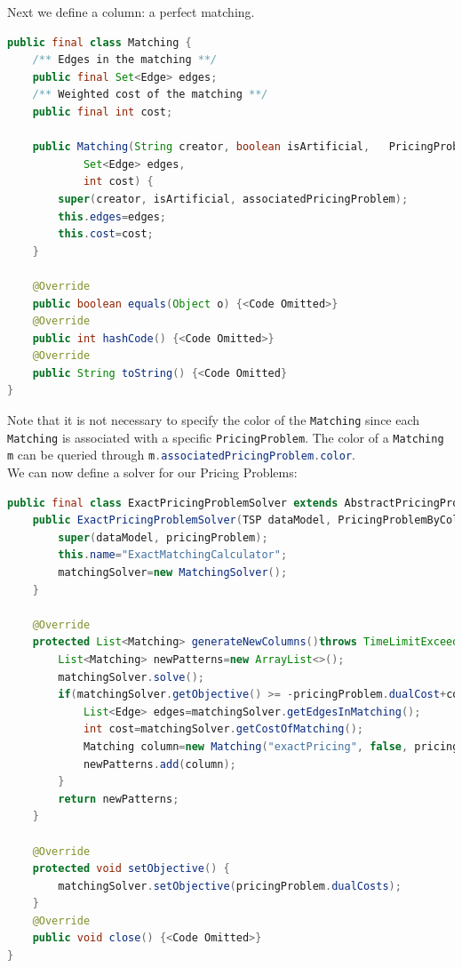 \documentclass[a4paper]{article}
\newenvironment{myblock}[1]{%
    \tcolorbox[beamer,%
    noparskip,breakable,
    colback=lightBlueCodeBlock,colframe=darkBlueCodeBlock,%
    colbacklower=darkBlueCodeBlock!75!lightBlueCodeBlock,%
    coltitle=blueTitleCodeBlock,
    title=#1]}%
    {\endtcolorbox}
\newcommand{\code}[1]{\lstinline[language=java, style=seminar]!#1!}
\begin{document}
Next we define a column: a perfect matching.
\begin{myblock}{Matching}
\begin{lstlisting}[language=java, style=eclipseArticle, xleftmargin=2em]  
public final class Matching {
	/** Edges in the matching **/
	public final Set<Edge> edges;
	/** Weighted cost of the matching **/
	public final int cost;

	public Matching(String creator, boolean isArtificial,	PricingProblemByColor associatedPricingProblem,
			Set<Edge> edges,
			int cost) {
		super(creator, isArtificial, associatedPricingProblem);
		this.edges=edges;
		this.cost=cost;
	}

	@Override
	public boolean equals(Object o) {<Code Omitted>}
	@Override
	public int hashCode() {<Code Omitted>}
	@Override
	public String toString() {<Code Omitted}
}
\end{lstlisting}
\end{myblock}
Note that it is not necessary to specify the color of the \code{Matching} since each \code{Matching} is associated with a specific \code{PricingProblem}. The color of a \code{Matching m} can be queried through \code{m.associatedPricingProblem.color}.\\
We can now define a solver for our Pricing Problems:
\begin{myblock}{ExactPricingProblemSolver}
\begin{lstlisting}[language=java, style=eclipseArticle, xleftmargin=2em]  
public final class ExactPricingProblemSolver extends AbstractPricingProblemSolver<TSP, Matching, PricingProblemByColor> {
	public ExactPricingProblemSolver(TSP dataModel, PricingProblemByColor pricingProblem) {
		super(dataModel, pricingProblem);
		this.name="ExactMatchingCalculator";
		matchingSolver=new MatchingSolver();
	}

	@Override
	protected List<Matching> generateNewColumns()throws TimeLimitExceededException {
		List<Matching> newPatterns=new ArrayList<>();
		matchingSolver.solve();
		if(matchingSolver.getObjective() >= -pricingProblem.dualCost+config.PRECISION){ //Generate new column
			List<Edge> edges=matchingSolver.getEdgesInMatching();
			int cost=matchingSolver.getCostOfMatching();
			Matching column=new Matching("exactPricing", false, pricingProblem, matching, cost);
			newPatterns.add(column);
		}
		return newPatterns;
	}

	@Override
	protected void setObjective() {
		matchingSolver.setObjective(pricingProblem.dualCosts);
	}
	@Override
	public void close() {<Code Omitted>}
}
\end{lstlisting}
\label{codeBlock:tspExactPricingProblemSolver}
\end{myblock}
\end{document}
